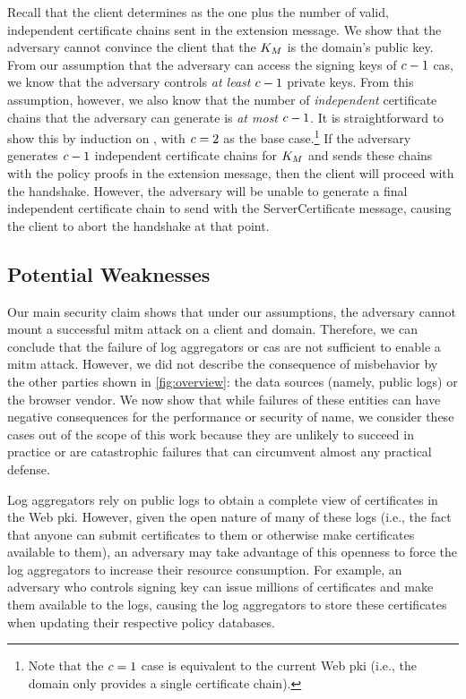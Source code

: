 Recall that the client determines \policy as the one plus the number of valid,
independent certificate chains sent in the extension message. We show that the
adversary cannot convince the client that the $K_M$ is the domain's
public key. From our assumption that the adversary can access the signing keys
of $c - 1$ \acp{ca}, we know that the adversary controls \emph{at least}
$c - 1$ private keys. From this assumption, however, we also know that the
number of \emph{independent} certificate chains that the adversary can generate
is \emph{at most} $c - 1$. It is straightforward to show this by induction
on \policy, with $c = 2$ as the base case.\footnote{Note that the $c
= 1$ case is equivalent to the current Web \ac{pki} (i.e., the domain only
provides a single certificate chain).} If the adversary generates $c - 1$
independent certificate chains for $K_M$ and sends these chains with
the policy proofs in the extension message, then the client will proceed with
the handshake. However, the adversary will be unable to generate a final
independent certificate chain to send with the ServerCertificate message,
causing the client to abort the handshake at that point.


\subsection{Potential Weaknesses}
\label{sec:analysis:weaknesses}

Our main security claim shows that under our assumptions, the adversary cannot
mount a successful \ac{mitm} attack on a client and domain. Therefore, we can
conclude that the failure of log aggregators or \acp{ca} are not sufficient to
enable a \ac{mitm} attack. However, we did not describe the consequence of
misbehavior by the other parties shown in \autoref{fig:overview}: the data
sources (namely, public logs) or the browser vendor. We now show that while
failures of these entities can have negative consequences for the performance or
security of \ac{name}, we consider these cases out of the scope of this work
because they are unlikely to succeed in practice or are catastrophic failures
that can circumvent almost any practical defense.

Log aggregators rely on public logs to obtain a complete view of certificates in
the Web \ac{pki}. However, given the open nature of many of these logs (i.e.,
the fact that anyone can submit certificates to them or otherwise make
certificates available to them), an adversary may take advantage of this
openness to force the log aggregators to increase their resource consumption.
For example, an adversary who controls  signing key can issue millions
of certificates and make them available to the logs, causing the log aggregators
to store these certificates when updating their respective policy databases.

